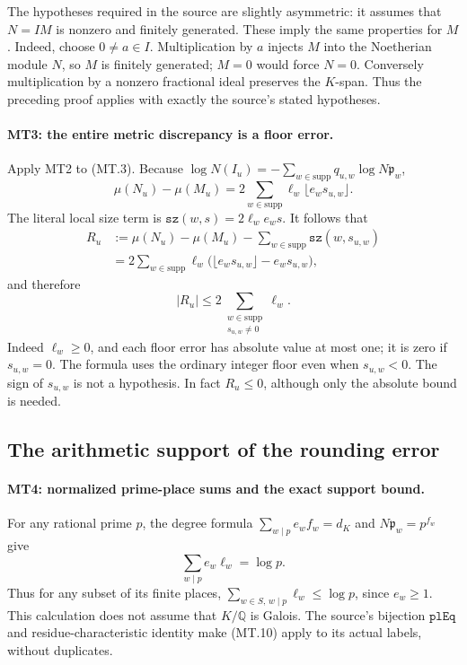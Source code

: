 The hypotheses required in the source are slightly asymmetric: it
assumes that $N=IM$ is nonzero and finitely generated.  These imply the
same properties for $M$.  Indeed, choose $0\ne a\in I$.  Multiplication
by $a$ injects $M$ into the Noetherian module $N$, so $M$ is finitely
generated; $M=0$ would force $N=0$.  Conversely multiplication by a
nonzero fractional ideal preserves the $K$-span.  Thus the preceding
proof applies with exactly the source's stated hypotheses.

\paragraph{MT3: the entire metric discrepancy is a floor error.}
\label{claim:MT3}
Apply MT2 to (MT.3).  Because
$\log N(I_u)=-\sum_{w\in\mathrm{supp}}q_{u,w}\log N\mathfrak p_w$,
\[
 \mu(N_u)-\mu(M_u)
      =2\sum_{w\in\mathrm{supp}}\ell_w\lfloor e_ws_{u,w}\rfloor.
                                                                  \tag{MT.7}
\]
The literal local size term is
$\texttt{sz}(w,s)=2\ell_we_ws$.  It follows that
\[
 \begin{split}
 R_u&:=\mu(N_u)-\mu(M_u)
              -\sum_{w\in\mathrm{supp}}\texttt{sz}(w,s_{u,w})\\
    &=2\sum_{w\in\mathrm{supp}}\ell_w
          \bigl(\lfloor e_ws_{u,w}\rfloor-e_ws_{u,w}\bigr),
 \end{split}                                                     \tag{MT.8}
\]
and therefore
\[
      |R_u|\le2\sum_{\substack{w\in\mathrm{supp}\\s_{u,w}\ne0}}
                          \ell_w.                                \tag{MT.9}
\]
Indeed $\ell_w\ge0$, and each floor error has absolute value at most
one; it is zero if $s_{u,w}=0$.  The formula uses the ordinary integer
floor even when $s_{u,w}<0$.  The sign of $s_{u,w}$ is not a hypothesis.
In fact $R_u\le0$, although only the absolute bound is needed.

\subsection{The arithmetic support of the rounding error}

\paragraph{MT4: normalized prime-place sums and the exact support bound.}
\label{claim:MT4}
For any rational prime $p$, the degree formula
$\sum_{w\mid p}e_wf_w=d_K$ and $N\mathfrak p_w=p^{f_w}$ give
\[
                  \sum_{w\mid p}e_w\ell_w=\log p.                 \tag{MT.10}
\]
Thus for any subset of its finite places,
$\sum_{w\in S,\,w\mid p}\ell_w\le\log p$, since $e_w\ge1$.
This calculation does not assume that $K/\mathbb Q$ is Galois.  The
source's bijection $\texttt{plEq}$ and residue-characteristic identity
make (MT.10) apply to its actual labels, without duplicates.

